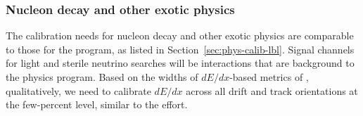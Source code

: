 

\subsubsection{Nucleon decay and other exotic physics}
The calibration needs for nucleon decay and other exotic physics are comparable to those for the  program, as listed in Section~\ref{sec:phys-calib-lbl}. Signal channels for light  and sterile neutrino searches will be  interactions that are background to the  physics program. 
Based on the widths of $dE/dx$-based metrics of , qualitatively, we need to calibrate $dE/dx$ across all drift and track orientations at the few-percent level, similar to the  effort.


